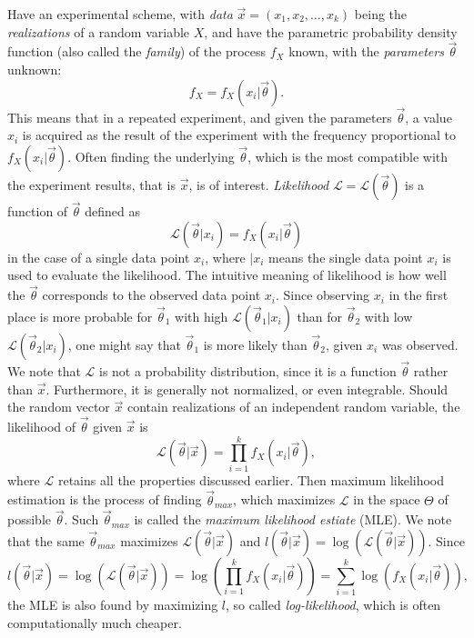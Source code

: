 Have an experimental scheme, with \textit{data} $\vec{x} = (x_1, x_2, \dots , x_k)$ being the \textit{realizations} of a random variable $X$, and have the parametric probability density function (also called the \textit{family}) of the process $f_X$ known, with the \textit{parameters} $\vec{\theta}$ unknown:
\begin{equation}
    f_X = f_X(x_i|\vec{\theta}). \label{eq:stat_experiment}
\end{equation}
This means that in a repeated experiment, and given the parameters $\vec{\theta}$, a value $x_i$ is acquired as the result of the experiment with the frequency proportional to $f_X(x_i|\vec{\theta})$. Often finding the underlying $\vec{\theta}$, which is the most compatible with the experiment results, that is $\vec{x}$, is of interest. \textit{Likelihood} $\mathcal{L}=\mathcal{L}(\vec{\theta})$ is a function of $\vec{\theta}$ defined as 
\begin{equation}
    \mathcal{L}(\vec{\theta}|x_i) = f_X(x_i|\vec{\theta})
\end{equation}
in the case of a single data point $x_i$, where $|x_i$ means the single data point $x_i$ is used to evaluate the likelihood. The intuitive meaning of likelihood is how well the $\vec{\theta}$ corresponds to the observed data point $x_i$. Since observing $x_i$ in the first place is more probable for $\vec{\theta}_1$ with high $\mathcal{L}(\vec{\theta}_1|x_i)$ than for $\vec{\theta}_2$ with low $\mathcal{L}(\vec{\theta}_2|x_i)$, one might say that $\vec{\theta}_1$ is more likely than $\vec{\theta}_2$, given $x_i$ was observed. We note that $\mathcal{L}$ is not a probability distribution, since it is a function $\vec{\theta}$ rather than $\vec{x}$. Furthermore, it is generally not normalized, or even integrable. Should the random vector $\vec{x}$ contain realizations of an independent random variable, the likelihood of $\vec{\theta}$ given $\vec{x}$ is 
\begin{equation}
    \mathcal{L}(\vec{\theta}|\vec{x}) = \prod_{i=1}^k f_X(x_i|\vec{\theta}),
\end{equation}
where $\mathcal{L}$ retains all the properties discussed earlier. Then maximum likelihood estimation is the process of finding $\vec{\theta}_{max}$, which maximizes $\mathcal{L}$ in the space $\Theta$ of possible $\vec{\theta}$. Such $\vec{\theta}_{max}$ is called the \textit{maximum likelihood estiate} (MLE). We note that the same $\vec{\theta}_{max}$ maximizes $\mathcal{L}(\vec{\theta}|\vec{x})$ and $l(\vec{\theta}|\vec{x}) = \log \left( \mathcal{L}(\vec{\theta}|\vec{x}) \right)$. Since 
\begin{equation}
    l(\vec{\theta}|\vec{x}) = \log \left( \mathcal{L}(\vec{\theta}|\vec{x}) \right) = \log \left( \prod_{i=1}^k f_X(x_i|\vec{\theta}) \right) =  \sum_{i=1}^k \log \left( f_X(x_i|\vec{\theta}) \right),
\end{equation}
the MLE is also found by maximizing $l$, so called \textit{log-likelihood}, which is often computationally much cheaper. 

